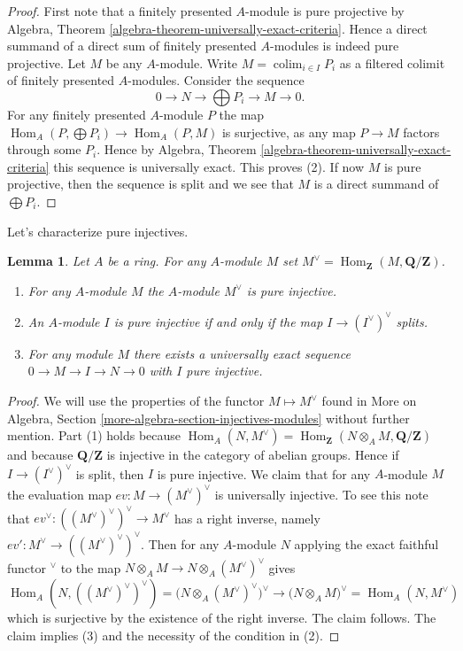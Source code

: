 \documentclass{stacks-project}
\theoremstyle{plain}
\newtheorem{lemma}[subsection]{Lemma}
\theoremstyle{definition}
\theoremstyle{remark}
\numberwithin{equation}{subsection}
\def\colim{\mathop{\mathrm{colim}}\nolimits}
\def\Hom{\mathop{\mathrm{Hom}}\nolimits}
\begin{document}
\begin{proof}
First note that a finitely presented $A$-module is pure projective by
Algebra, Theorem \ref{algebra-theorem-universally-exact-criteria}.
Hence a direct summand of a direct sum of finitely presented $A$-modules
is indeed pure projective. Let $M$ be any $A$-module.
Write $M = \colim_{i \in I} P_i$ as a filtered colimit of
finitely presented $A$-modules. Consider the sequence
$$
0 \to N \to \bigoplus P_i \to M \to 0.
$$
For any finitely presented $A$-module $P$ the map
$\Hom_A(P, \bigoplus P_i) \to \Hom_A(P, M)$
is surjective, as any map $P \to M$ factors through some $P_i$.
Hence by
Algebra, Theorem \ref{algebra-theorem-universally-exact-criteria}
this sequence is universally exact. This proves (2).
If now $M$ is pure projective, then the sequence is split and
we see that $M$ is a direct summand of $\bigoplus P_i$.
\end{proof}

\noindent
Let's characterize pure injectives.

\begin{lemma}
\label{lemma-pure-injective}
Let $A$ be a ring. For any $A$-module $M$ set
$M^\vee = \Hom_\mathbf{Z}(M, \mathbf{Q}/\mathbf{Z})$.
\begin{enumerate}
\item For any $A$-module $M$ the $A$-module $M^\vee$ is pure injective.
\item An $A$-module $I$ is pure injective if and only if the map
$I \to (I^\vee)^\vee$ splits.
\item For any module $M$ there exists a universally exact sequence
$0 \to M \to I \to N \to 0$ with $I$ pure injective.
\end{enumerate}
\end{lemma}

\begin{proof}
We will use the properties of the functor $M \mapsto M^\vee$ found in
More on Algebra, Section \ref{more-algebra-section-injectives-modules}
without further mention. Part (1) holds because
$\Hom_A(N, M^\vee) =
\Hom_\mathbf{Z}(N \otimes_A M, \mathbf{Q}/\mathbf{Z})$
and because $\mathbf{Q}/\mathbf{Z}$ is injective in the category of
abelian groups. Hence if $I \to (I^\vee)^\vee$ is split, then
$I$ is pure injective. We claim that for any $A$-module $M$ the
evaluation map $ev : M \to (M^\vee)^\vee$ is universally injective.
To see this note that $ev^\vee : ((M^\vee)^\vee)^\vee \to M^\vee$
has a right inverse, namely $ev' : M^\vee \to ((M^\vee)^\vee)^\vee$.
Then for any $A$-module $N$ applying the exact faithful functor
${}^\vee$ to the map $N \otimes_A M \to N \otimes_A (M^\vee)^\vee$
gives
$$
\Hom_A(N, ((M^\vee)^\vee)^\vee) =
\Big(N \otimes_A (M^\vee)^\vee\Big)^\vee
\to
\Big(N \otimes_A M\Big)^\vee =
\Hom_A(N, M^\vee)
$$
which is surjective by the existence of the right inverse. The claim follows.
The claim implies (3) and the necessity of the condition in (2).
\end{proof}
\end{document}
